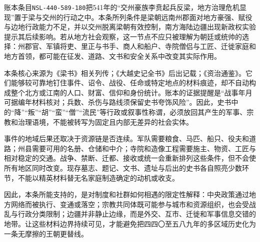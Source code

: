账本条目\texttt{NSL-440-589-180}把541年的“交州豪族李贲起兵反梁，地方治理危机显现”置于梁与交州的行动之中。本条所列条件是梁朝远南州郡面对地方豪强、赋役与边地行政能力不足，并以交州脱离梁朝有效控制，南方海陆边疆出现新政权实验提示其后续影响。若从地方社会观察，这一节点不应只被理解为朝廷或统帅的选择：州郡官、军镇将吏、里正与书手、商人和船户、寺院僧侣与工匠、迁徙家庭和地方首领，都可能在征发、道路、文书和安全关系中改变其实际作用。

本条核心来源为《梁书》相关列传；《大越史记全书》后出记载；《资治通鉴》。它们能够较可靠地钉住事件、诏令、战役、任命或特定地点的材料痕迹，却不自动构成整个北方或江南的人口、财富、信仰和身份统计。账本的证据提醒是“战事年月可据编年材料核对；兵数、杀伤与路线须保留史书夸饰风险”。因此，史书中的“降”“叛”“胡”“蛮”“僧”“流民”等行政或叙事性称谓，必须放回其产生的军事、宗教和治理语境，不能被转写为固定且内部无差异的社会实体。

事件的地域后果还取决于资源链是否连续。军队需要粮食、马匹、船只、役夫和道路；州县需要可用的名册、仓储和中介；寺院和造像工程需要施主、物资、工匠与相对稳定的交通。战争、禁断、迁都、接收或统一会重新排列这些条件，但不会使所有地区同时改变。现存墓志、题记、文书、遗址与后出的史书各自照亮少数环节，不能以精英材料替无名家庭制造确定的动机或收支。

因此，本条所能支持的，是对制度和社群如何相遇的限定性解释：中央政策通过地方网络而被执行、变通或落空；宗教共同体既可能参与城市和资源组织，也会受战乱与行政分类限制；边疆并非静止边缘，而是外交、互市、迁徙和军事信息交错的地带。让这些材料边界持续可见，才能避免把四四〇至五八九年的多区域历史化为一条无摩擦的王朝更替线。

